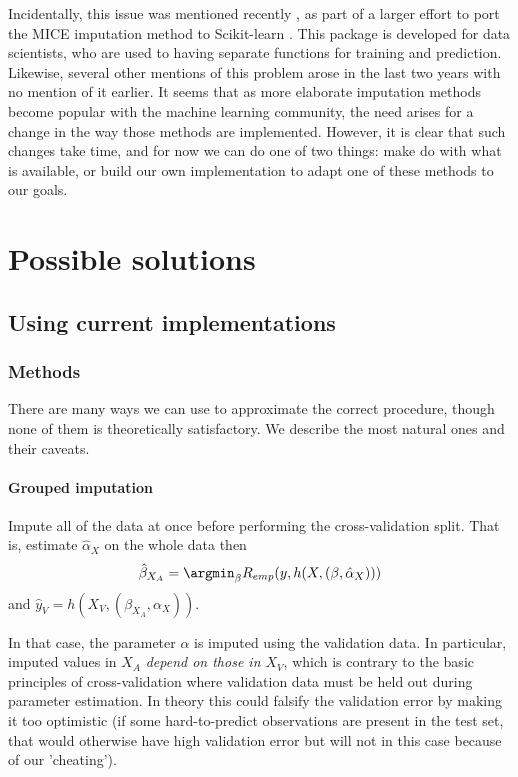 Incidentally, this issue was mentioned recently \cite{github_sklearn}, as part of a larger effort to port the MICE \cite{MICE_founding} imputation method to Scikit-learn \cite{scikit-learn}. This package is developed for data scientists, who are used to having separate functions for training and prediction. Likewise, several other mentions of this problem arose in the last two years \cite{thread_newdata1}\cite{thread_newdata2}\cite{thread_newdata3} with no mention of it earlier. It seems that as more elaborate imputation methods become popular with the machine learning community, the need arises for a change in the way those methods are implemented. However, it is clear that such changes take time, and for now we can do one of two things: make do with what is available, or build our own implementation to adapt one of these methods to our goals.
	\section{Possible solutions}
		\subsection{Using current implementations}
			\subsubsection{Methods}
There are many ways we can use to approximate the correct procedure, though none of them is theoretically satisfactory. We describe the most natural ones and their caveats.

\paragraph{Grouped imputation} Impute all of the data at once before performing the cross-validation split. That is, estimate $\hat{\alpha}_X$ on the whole data then $$\hat{\beta}_{X_A} = \argmin_{\beta} R_{emp}(y, h(X, (\beta, \hat{\alpha}_X)))$$
 and $\hat{y}_V = h(X_V, (\beta_{X_A}, \alpha_X))$. 

In that case, the parameter $\alpha$ is imputed using the validation data. In particular, imputed values in $X_A$ \emph{depend on those in $X_V$}, which is contrary to the basic principles of cross-validation where validation data must be held out during parameter estimation. In theory this could falsify the validation error by making it too optimistic (if some hard-to-predict observations are present in the test set, that would otherwise have high validation error but will not in this case because of our 'cheating').


